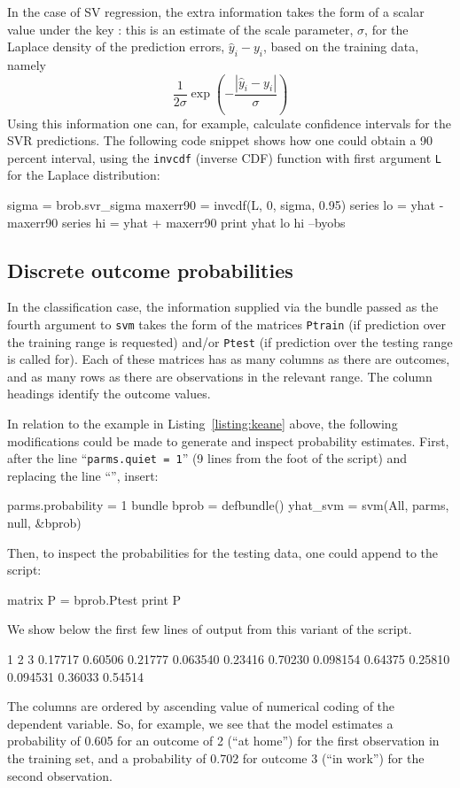 \documentclass{article}
\begin{document}
In the case of SV regression, the extra information takes the
form of a scalar value under the key : this is an
estimate of the scale parameter, $\sigma$, for the Laplace density of
the prediction errors, $\hat{y}_i - y_i$, based on the training data,
namely
\[
\frac{1}{2\sigma} \exp \left(-\frac{|\hat{y}_i - y_i|}{\sigma}\right)
\]
Using this information one can, for example, calculate confidence
intervals for the SVR predictions. The following code snippet shows
how one could obtain a 90 percent interval, using the \texttt{invcdf}
(inverse CDF) function with first argument \texttt{L} for the Laplace
distribution:
\begin{code}
sigma = brob.svr_sigma
maxerr90 = invcdf(L, 0, sigma, 0.95)
series lo = yhat - maxerr90
series hi = yhat + maxerr90
print yhat lo hi --byobs
\end{code}

\subsection{Discrete outcome probabilities}
\label{sec:SVC-probs}

In the classification case, the information supplied via the bundle
passed as the fourth argument to \texttt{svm} takes the form of the
matrices \texttt{Ptrain} (if prediction over the training range is
requested) and/or \texttt{Ptest} (if prediction over the testing range
is called for). Each of these matrices has as many columns as there
are outcomes, and as many rows as there are observations in the
relevant range. The column headings identify the outcome values.

In relation to the example in Listing~\ref{listing:keane} above, the
following modifications could be made to generate and inspect
probability estimates. First, after the line ``\texttt{parms.quiet =
  1}'' (9 lines from the foot of the script) and replacing the line
``'', insert:
%
\begin{code}
parms.probability = 1
bundle bprob = defbundle()
yhat_svm = svm(All, parms, null, &bprob)
\end{code}
Then, to inspect the probabilities for the testing data, one could
append to the script:
%
\begin{code}
matrix P = bprob.Ptest
print P
\end{code}
%
We show below the first few lines of output from this variant of
the script.
%
\begin{code}
           1            2            3
     0.17717      0.60506      0.21777
    0.063540      0.23416      0.70230
    0.098154      0.64375      0.25810
    0.094531      0.36033      0.54514
\end{code}
%
The columns are ordered by ascending value of numerical coding of the
dependent variable. So, for example, we see that the model estimates a
probability of 0.605 for an outcome of 2 (``at home'') for the first
observation in the training set, and a probability of 0.702 for
outcome 3 (``in work'') for the second observation.
\end{document}
